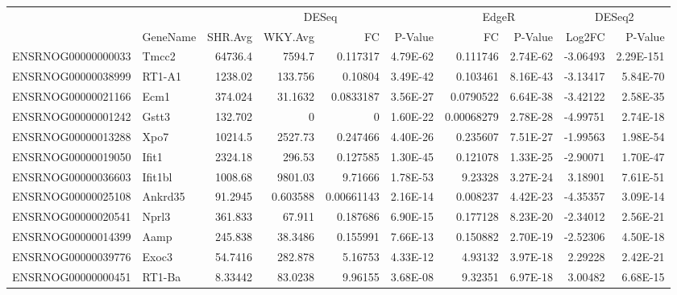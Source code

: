 \begin{sidewaystable}[]
\scriptsize
\centering
\begin{tabular}{llrrrrrrrr}
                   &          & \multicolumn{4}{c}{DESeq}                             & \multicolumn{2}{c}{EdgeR} & \multicolumn{2}{c}{DESeq2} \\
                   & GeneName & SHR.Avg & WKY.Avg & FC         & P-Value    & FC           & P-Value    & Log2FC      & P-Value      \\
                   \hline
ENSRNOG00000000033 & Tmcc2    & 64736.4      & 7594.7       & 0.117317   & 4.79E-62   & 0.111746     & 2.74E-62   & -3.06493    & 2.29E-151    \\
ENSRNOG00000038999 & RT1-A1   & 1238.02      & 133.756      & 0.10804    & 3.49E-42   & 0.103461     & 8.16E-43   & -3.13417    & 5.84E-70     \\
ENSRNOG00000021166 & Ecm1     & 374.024      & 31.1632      & 0.0833187  & 3.56E-27   & 0.0790522    & 6.64E-38   & -3.42122    & 2.58E-35     \\
ENSRNOG00000001242 & Gstt3    & 132.702      & 0            & 0          & 1.60E-22   & 0.00068279   & 2.78E-28   & -4.99751    & 2.74E-18     \\
ENSRNOG00000013288 & Xpo7     & 10214.5      & 2527.73      & 0.247466   & 4.40E-26   & 0.235607     & 7.51E-27   & -1.99563    & 1.98E-54     \\
ENSRNOG00000019050 & Ifit1    & 2324.18      & 296.53       & 0.127585   & 1.30E-45   & 0.121078     & 1.33E-25   & -2.90071    & 1.70E-47     \\
ENSRNOG00000036603 & Ifit1bl  & 1008.68      & 9801.03      & 9.71666    & 1.78E-53   & 9.23328      & 3.27E-24   & 3.18901     & 7.61E-51     \\
ENSRNOG00000025108 & Ankrd35  & 91.2945      & 0.603588     & 0.00661143 & 2.16E-14   & 0.008237     & 4.42E-23   & -4.35357    & 3.09E-14     \\
ENSRNOG00000020541 & Nprl3    & 361.833      & 67.911       & 0.187686   & 6.90E-15   & 0.177128     & 8.23E-20   & -2.34012    & 2.56E-21     \\
ENSRNOG00000014399 & Aamp     & 245.838      & 38.3486      & 0.155991   & 7.66E-13   & 0.150882     & 2.70E-19   & -2.52306    & 4.50E-18     \\
ENSRNOG00000039776 & Exoc3    & 54.7416      & 282.878      & 5.16753    & 4.33E-12   & 4.93132      & 3.97E-18   & 2.29228     & 2.42E-21     \\
ENSRNOG00000000451 & RT1-Ba   & 8.33442      & 83.0238      & 9.96155    & 3.68E-08   & 9.32351      & 6.97E-18   & 3.00482     & 6.68E-15     \\

\end{tabular}
\end{sidewaystable}
